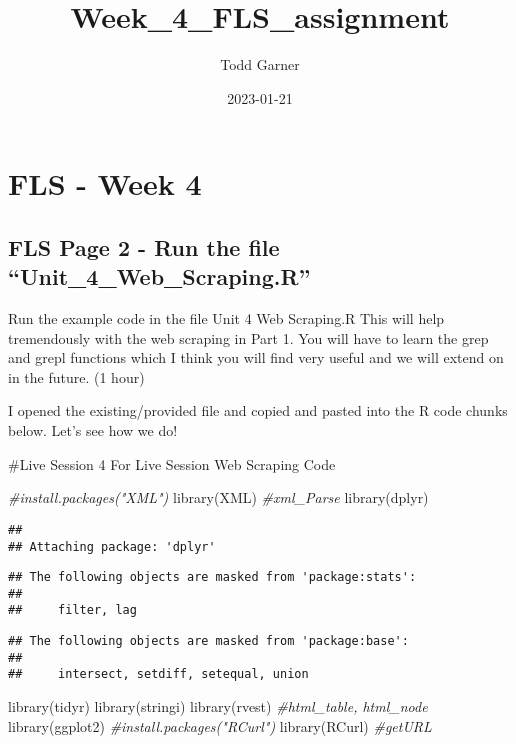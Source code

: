 \documentclass[
]{article}
\title{Week\_4\_FLS\_assignment}
\author{Todd Garner}
\date{2023-01-21}
\newenvironment{Shaded}{\begin{snugshade}}{\end{snugshade}}
\newcommand{\CommentTok}[1]{\textcolor[rgb]{0.56,0.35,0.01}{\textit{#1}}}
\newcommand{\FunctionTok}[1]{\textcolor[rgb]{0.00,0.00,0.00}{#1}}
\newcommand{\NormalTok}[1]{#1}
\begin{document}
\maketitle

{
\setcounter{tocdepth}{2}
\tableofcontents
}
\hypertarget{fls---week-4}{%
\section{FLS - Week 4}\label{fls---week-4}}

\hypertarget{fls-page-2---run-the-file-unit_4_web_scraping.r}{%
\subsection{FLS Page 2 - Run the file
``Unit\_4\_Web\_Scraping.R''}\label{fls-page-2---run-the-file-unit_4_web_scraping.r}}

Run the example code in the file Unit 4 Web Scraping.R This will help
tremendously with the web scraping in Part 1. You will have to learn the
grep and grepl functions which I think you will find very useful and we
will extend on in the future. (1 hour)

I opened the existing/provided file and copied and pasted into the R
code chunks below. Let's see how we do!

\#Live Session 4 For Live Session Web Scraping Code

\begin{Shaded}
\begin{Highlighting}[]
\CommentTok{\#install.packages("XML")}
\FunctionTok{library}\NormalTok{(XML) }\CommentTok{\#xml\_Parse}
\FunctionTok{library}\NormalTok{(dplyr)}
\end{Highlighting}
\end{Shaded}

\begin{verbatim}
## 
## Attaching package: 'dplyr'
\end{verbatim}

\begin{verbatim}
## The following objects are masked from 'package:stats':
## 
##     filter, lag
\end{verbatim}

\begin{verbatim}
## The following objects are masked from 'package:base':
## 
##     intersect, setdiff, setequal, union
\end{verbatim}

\begin{Shaded}
\begin{Highlighting}[]
\FunctionTok{library}\NormalTok{(tidyr)}
\FunctionTok{library}\NormalTok{(stringi)}
\FunctionTok{library}\NormalTok{(rvest) }\CommentTok{\#html\_table, html\_node}
\FunctionTok{library}\NormalTok{(ggplot2)}
\CommentTok{\#install.packages("RCurl")}
\FunctionTok{library}\NormalTok{(RCurl) }\CommentTok{\#getURL}
\end{Highlighting}
\end{Shaded}
\end{document}
